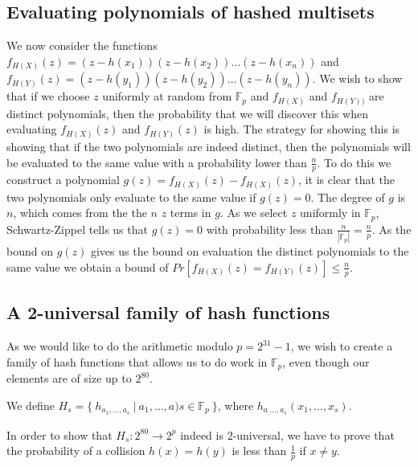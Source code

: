 \documentclass[article,a4paper,oneside]{article}
\newcommand{\+}[1]{\ensuremath{\boldsymbol{#1}}}
\begin{document}
\subsection*{Evaluating polynomials of hashed multisets}
We now consider the functions $f_{H(X)}(z) = (z-h(x_1))(z-h(x_2))\ldots(z - h(x_n))$ and $f_{H(Y)}(z) = (z-h(y_1))(z-h(y_2))\ldots(z - h(y_n))$.
We wish to show that if we choose $z$ uniformly at random from $\mathbb{F}_p$ and $f_{H(X)}$ and $f_{H(Y))}$ are distinct polynomials, then the probability that we will discover this when evaluating $f_{H(X)}(z)$ and $f_{H(Y)}(z)$ is high. The strategy for showing this is showing that if the two polynomials are indeed distinct, then the polynomials will be evaluated to the same value with a probability lower than $\frac{n}{p}$.
To do this we construct a polynomial $g(z) = f_{H(X)}(z) - f_{H(X)}(z)$, it is clear that the two polynomials only evaluate to the same value if $g(z) = 0$. The degree of $g$ is $n$, which comes from the the $n$ $z$ terms in $g$.
As we select $z$ uniformly in $\mathbb{F}_p$, Schwartz-Zippel tells us that $g(z) = 0$ with probability less than $\frac{n}{|\mathbb{F}_p|} = \frac{n}{p}$. As the bound on $g(z)$ gives us the bound on evaluation the distinct polynomials to the same value we obtain a bound of $Pr[f_{H(X)}(z) = f_{H(Y)}(z)] \leq \frac{n}{p}$.

\subsection*{A 2-universal family of hash functions}
As we would like to do the arithmetic modulo $p = 2^{31}-1$, we wish to create a family of hash functions that allows us to do work in $\mathbb{F}_p$, even though our elements are of size up to $2^{80}$.

We define $H_s=\{\ h_{a_1,\ldots,a_s}\ | \ a_1,\ldots,a)s\in \mathbb{F}_p\ \}$,
where $h_{a_,\ldots,a_s}(x_1,\ldots,x_s)$.

In order to show that $H_s: 2^{80} \rightarrow 2^p$ indeed is 2-universal, we have to prove that the probability of a collision $h(x) = h(y)$ is less than $\frac{1}{p}$ if $x \neq y$.
\end{document}
